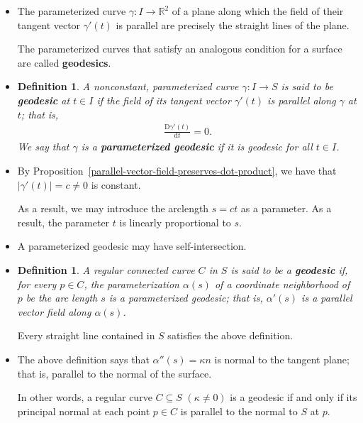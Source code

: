\documentclass[10pt]{article}
\newtheorem{definition}[lemma]{Definition}
\newcommand{\dee}{\mathrm{d}}
\newcommand{\Dee}{\mathrm{D}}
\newcommand{\ra}{\rightarrow}
\newcommand{\Real}{\mathbb{R}}
\newcommand{\sseq}{\subseteq}
\begin{document}
  \begin{itemize}
    \item The parameterized curve $\gamma : I \ra \Real^2$ of a plane along which the field of their tangent vector $\gamma'(t)$ is parallel are precisely the straight lines of the plane.

    The parameterized curves that satisfy an analogous condition for a surface are called {\bf geodesics}.

    \item \begin{definition}
      A nonconstant, parameterized curve $\gamma : I \ra S$ is said to be {\bf geodesic} at $t \in I$ if the field of its tangent vector $\gamma'(t)$ is parallel along $\gamma$ at $t$; that is,
      \begin{align*}
        \frac{\Dee \gamma'(t)}{\dee t} = 0.
      \end{align*}
      We say that $\gamma$ is a {\bf parameterized geodesic} if it is geodesic for all $t \in I$.
    \end{definition}

    \item By Proposition~\ref{parallel-vector-field-preserves-dot-product}, we have that $|\gamma'(t)| = c \neq 0$ is constant. 

    As a result, we may introduce the arclength $s = ct$ as a parameter. As a result, the parameter $t$ is linearly proportional to $s$.

    \item A parameterized geodesic may have self-intersection.

    \item \begin{definition}
      A regular connected curve $C$ in $S$ is said to be a {\bf geodesic} if, for every $p \in C$, the parameterization $\alpha(s)$ of a coordinate neighborhood of $p$ be the arc length $s$ is a parameterized geodesic; that is, $\alpha'(s)$ is a parallel vector field along $\alpha(s)$.
    \end{definition}

    Every straight line contained in $S$ satisfies the above definition.

    \item The above definition says that $\alpha''(s) = \kappa n$ is normal to the tangent plane; that is, parallel to the normal of the surface.

    In other words, a regular curve $C \sseq S$ $(\kappa \neq 0)$ is a geodesic if and only if its principal normal at each point $p \in C$ is parallel to the normal to $S$ at $p$.


\end{itemize}
\end{document}
